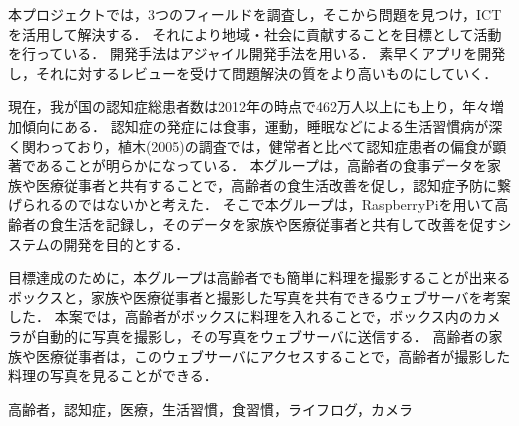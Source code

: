 \documentclass[../report]{subfiles}
\begin{document}
\begin{jabstract}
本プロジェクトでは，3つのフィールドを調査し，そこから問題を見つけ，ICTを活用して解決する．
それにより地域・社会に貢献することを目標として活動を行っている．
開発手法はアジャイル開発手法を用いる．
素早くアプリを開発し，それに対するレビューを受けて問題解決の質をより高いものにしていく．

現在，我が国の認知症総患者数は2012年の時点で462万人以上にも上り，年々増加傾向にある\cite{zouka}．
認知症の発症には食事，運動，睡眠などによる生活習慣病が深く関わっており，植木(2005)の調査では，健常者と比べて認知症患者の偏食が顕著であることが明らかになっている\cite{ueki}．
本グループは，高齢者の食事データを家族や医療従事者と共有することで，高齢者の食生活改善を促し，認知症予防に繋げられるのではないかと考えた．
そこで本グループは，RaspberryPiを用いて高齢者の食生活を記録し，そのデータを家族や医療従事者と共有して改善を促すシステムの開発を目的とする．

目標達成のために，本グループは高齢者でも簡単に料理を撮影することが出来るボックスと，家族や医療従事者と撮影した写真を共有できるウェブサーバを考案した．
本案では，高齢者がボックスに料理を入れることで，ボックス内のカメラが自動的に写真を撮影し，その写真をウェブサーバに送信する．
高齢者の家族や医療従事者は，このウェブサーバにアクセスすることで，高齢者が撮影した料理の写真を見ることができる．
\begin{jkeyword}
高齢者，認知症，医療，生活習慣，食習慣，ライフログ，カメラ
\end{jkeyword}
\end{jabstract}
\end{document}
